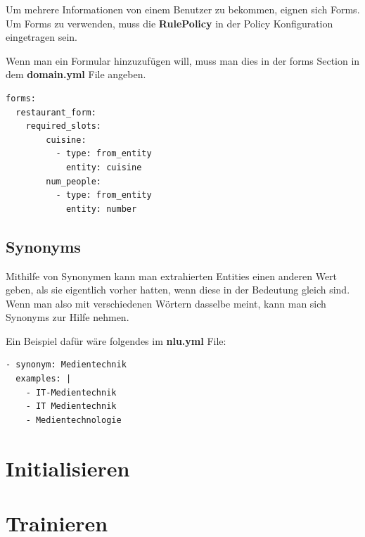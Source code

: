 Um mehrere Informationen von einem Benutzer zu bekommen, eignen sich Forms.
Um Forms zu verwenden, muss die \textbf{RulePolicy} in der Policy Konfiguration eingetragen sein.\cite{forms}

Wenn man ein Formular hinzuzufügen will, muss man dies in der forms Section in dem \textbf{domain.yml} File angeben.

\begin{lstlisting}[label={lst: Forms Example}]
forms:
  restaurant_form:
    required_slots:
        cuisine:
          - type: from_entity
            entity: cuisine
        num_people:
          - type: from_entity
            entity: number
\end{lstlisting}


\subsection{Synonyms}

Mithilfe von Synonymen kann man extrahierten Entities einen anderen Wert geben, als sie eigentlich vorher hatten, wenn diese in der Bedeutung gleich sind.
Wenn man also mit verschiedenen Wörtern dasselbe meint, kann man sich Synonyms zur Hilfe nehmen.\cite{synonyms}

Ein Beispiel dafür wäre folgendes im \textbf{nlu.yml} File:

\begin{lstlisting}[label={lst: Synonym Example}]
- synonym: Medientechnik
  examples: |
    - IT-Medientechnik
    - IT Medientechnik
    - Medientechnologie
\end{lstlisting}

\section{Initialisieren}


\section{Trainieren}
